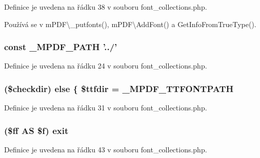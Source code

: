 Definice je uvedena na řádku 38 v souboru font\-\_\-collections.\-php.



Používá se v m\-P\-D\-F\textbackslash{}\-\_\-putfonts(), m\-P\-D\-F\textbackslash{}\-Add\-Font() a Get\-Info\-From\-True\-Type().

\hypertarget{font__collections_8php_a79734099b3f1817b14687db06cde3132}{
\subsubsection[{\-\_\-\-M\-P\-D\-F\-\_\-\-P\-A\-T\-H}]{\setlength{\rightskip}{0pt plus 5cm}const \-\_\-\-M\-P\-D\-F\-\_\-\-P\-A\-T\-H '../'}}\label{font__collections_8php_a79734099b3f1817b14687db06cde3132}


Definice je uvedena na řádku 24 v souboru font\-\_\-collections.\-php.

\hypertarget{font__collections_8php_a5271a2344cca2dc08862484f40ba9273}{
\subsubsection[{else}]{ (\$checkdir) else \{ \$ttfdir = \-\_\-\-M\-P\-D\-F\-\_\-\-T\-T\-F\-O\-N\-T\-P\-A\-T\-H}}\label{font__collections_8php_a5271a2344cca2dc08862484f40ba9273}


Definice je uvedena na řádku 31 v souboru font\-\_\-collections.\-php.

\hypertarget{font__collections_8php_a1fe6089a8ea9dad4d98c742e8c25b329}{
\subsubsection[{exit}]{ (\$ff A\-S \$f) exit}}\label{font__collections_8php_a1fe6089a8ea9dad4d98c742e8c25b329}


Definice je uvedena na řádku 43 v souboru font\-\_\-collections.\-php.

